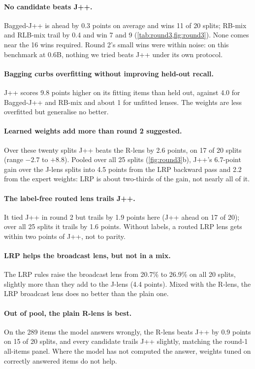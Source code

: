 \documentclass[11pt]{article}
\theoremstyle{definition}
\begin{document}
\paragraph{No candidate beats J++.} Bagged-J++ is ahead by 0.3 points on average and wins 11 of 20
splits; RB-mix and RLB-mix trail by 0.4 and win 7 and 9 (\cref{tab:round3,fig:round3}). None comes near
the 16 wins required. Round 2's small wins were within noise: on this benchmark at 0.6B, nothing we tried
beats J++ under its own protocol.

\paragraph{Bagging curbs overfitting without improving held-out recall.} J++ scores 9.8 points higher
on its fitting items than held out, against 4.0 for Bagged-J++ and RB-mix and about 1 for unfitted
lenses. The weights are less overfitted but generalise no better.

\paragraph{Learned weights add more than round 2 suggested.} Over these twenty splits J++ beats the
R-lens by 2.6 points, on 17 of 20 splits (range $-2.7$ to $+8.8$). Pooled over all 25 splits
(\cref{fig:round3}b), J++'s 6.7-point gain over the J-lens splits into 4.5 points from the LRP backward
pass and 2.2 from the expert weights: LRP is about two-thirds of the gain, not nearly all of it.

\paragraph{The label-free routed lens trails J++.} It tied J++ in round 2 but trails by 1.9 points here
(J++ ahead on 17 of 20); over all 25 splits it trails by 1.6 points. Without labels, a routed LRP lens
gets within two points of J++, not to parity.

\paragraph{LRP helps the broadcast lens, but not in a mix.} The LRP rules raise the broadcast lens from
20.7\% to 26.9\% on all 20 splits, slightly more than they add to the J-lens (4.4 points). Mixed with
the R-lens, the LRP broadcast lens does no better than the plain one.

\paragraph{Out of pool, the plain R-lens is best.} On the 289 items the model answers wrongly, the
R-lens beats J++ by 0.9 points on 15 of 20 splits, and every candidate trails J++ slightly, matching the
round-1 all-items panel. Where the model has not computed the answer, weights tuned on correctly
answered items do not help.
\end{document}
